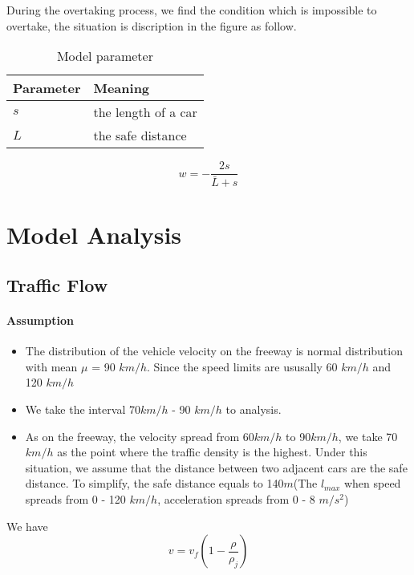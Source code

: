 During the overtaking
process, we find the condition which
is impossible to overtake, the situation
is discription in the figure as follow.

\begin{table}
\centering
\begin{tabular}{ll}
\hline
Parameter & Meaning\\
\hline
$s$ & the length of a car \\
$L$ & the safe distance \\
\hline
\end{tabular}
\caption{Model parameter}
\end{table}

\begin{equation}
w = - \frac{2s}{\bar{L} + s} 
\end{equation}
  

\section{Model Analysis}

\subsection{Traffic Flow}
\paragraph{Assumption}
\begin{itemize}
\item The distribution of the
vehicle velocity on the freeway
is normal distribution with mean
$\mu$ = 90 $km/h$. Since the speed 
limits are ususally 60 $km/h$ and 120 $km/h$
\item We take the interval 70$km/h$ - 90 $km/h$
to analysis.
\item As on the freeway, the velocity spread from
60$km/h$ to 90$km/h$, we take 70$km/h$ as the point where the traffic density is the highest.
Under this situation, we assume that the distance between two adjacent cars are the
safe distance. To simplify, the safe distance
equals to 140$m$(The $l_{max}$ when speed spreads from 0 - 120 $km/h$, acceleration spreads from 0 - 8 $m/s^2$)

\end{itemize}

We have 
\begin{equation}
v = v_f(1 - \frac{\rho}{\rho_j})
\end{equation}

